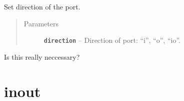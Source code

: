 \documentclass[a4paper,10pt,english]{sphinxmanual}
\begin{document}
\begin{fulllineitems}
\begin{fulllineitems}
\label{model_link:model.PortItem.PortItem.setDirection}
Set direction of the port.
\begin{quote}\begin{description}
\item[{Parameters}] \leavevmode
\textbf{\texttt{direction}} -- Direction of port: ``i'', ``o'', ``io''.

\end{description}\end{quote}

\end{fulllineitems}


\begin{fulllineitems}
\label{model_link:model.PortItem.PortItem.setPort}
Is this really neccessary?

\end{fulllineitems}


\end{fulllineitems}


\begin{fulllineitems}
\label{model_link:model.PortItem.bin_}
\end{fulllineitems}


\begin{fulllineitems}
\label{model_link:model.PortItem.hex_}
\end{fulllineitems}


\begin{fulllineitems}
\label{model_link:model.PortItem.oct_}
\end{fulllineitems}



\chapter{inout}
\label{inout_link:module-inout.XMLIO}\label{inout_link:inout}\label{inout_link::doc}
\end{document}
